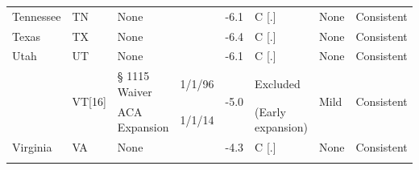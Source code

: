 \documentclass[12pt]{article}%
\begin{document}
\begin{appendices}
\begin{table}[]
\begin{adjustbox}{width=.99\textwidth}
\begin{tabular}{@{}llllllll@{}}
Tennessee                                    & TN                          & None                                                                                                        &                          & -6.1                                                                                     & C {[}.{]}                     & None                         & Consistent                                                                                 \\ \addlinespace
Texas                                        & TX                          & None                                                                                                        &                          & -6.4                                                                                     & C {[}.{]}                     & None                         & Consistent                                                                                 \\ \addlinespace
Utah                                         & UT                          & None                                                                                                        &                          & -6.1                                                                                     & C {[}.{]}                     & None                         & Consistent                                                                                 \\ \addlinespace
\multirow{2}{*}{Vermont}                     & \multirow{2}{*}{VT{[}16{]}} & § 1115 Waiver                                                                                               & 1/1/96                   & \multirow{2}{*}{-5.0}                                                                    & Excluded                      & \multirow{2}{*}{Mild}        & \multirow{2}{*}{Consistent}                                                                \\ 
                                             &                             & ACA Expansion                                                                                               & 1/1/14                   &                                                                                          & (Early expansion)             &                              &                                                                                            \\ \addlinespace
Virginia                                     & VA                          & None                                                                                                        &                          & -4.3                                                                                     & C {[}.{]}                     & None                         & Consistent                                                                                 \\ \addlinespace

\end{tabular}
\end{adjustbox}
\end{table}
\end{appendices}
\end{document}
